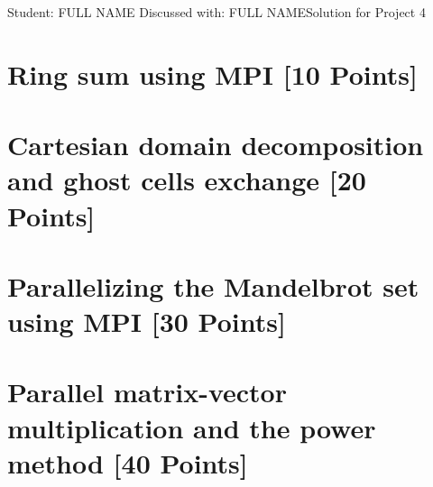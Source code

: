 \documentclass[unicode,11pt,a4paper,oneside,numbers=endperiod,openany]{scrartcl}
\begin{document}
\setassignment
{}

            {Student: FULL NAME}
            {Discussed with: FULL NAME}{Solution for Project 4}{}
\newline

\assignmentpolicy

\section{Ring sum using MPI [10 Points]}

\section{Cartesian domain decomposition and ghost cells exchange [20 Points]}

\section{Parallelizing the Mandelbrot set using MPI [30 Points]}

\section{Parallel matrix-vector multiplication and the power method
         [40 Points]}
\end{document}
